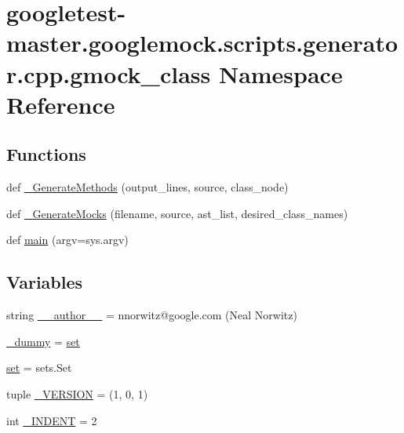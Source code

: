 \hypertarget{namespacegoogletest-master_1_1googlemock_1_1scripts_1_1generator_1_1cpp_1_1gmock__class}{}\section{googletest-\/master.googlemock.\+scripts.\+generator.\+cpp.\+gmock\+\_\+class Namespace Reference}
\label{namespacegoogletest-master_1_1googlemock_1_1scripts_1_1generator_1_1cpp_1_1gmock__class}
\subsection*{Functions}
\begin{DoxyCompactItemize}
\item 
def \mbox{\hyperlink{namespacegoogletest-master_1_1googlemock_1_1scripts_1_1generator_1_1cpp_1_1gmock__class_ab82be69c6bd483ffdd04d11f6bb66256}{\+\_\+\+Generate\+Methods}} (output\+\_\+lines, source, class\+\_\+node)
\item 
def \mbox{\hyperlink{namespacegoogletest-master_1_1googlemock_1_1scripts_1_1generator_1_1cpp_1_1gmock__class_ac9e5319db0f78f43d8dab068e8ac6c42}{\+\_\+\+Generate\+Mocks}} (filename, source, ast\+\_\+list, desired\+\_\+class\+\_\+names)
\item 
def \mbox{\hyperlink{namespacegoogletest-master_1_1googlemock_1_1scripts_1_1generator_1_1cpp_1_1gmock__class_acf709d6f879e39af13ddebafc93b36e2}{main}} (argv=sys.\+argv)
\end{DoxyCompactItemize}
\subsection*{Variables}
\begin{DoxyCompactItemize}
\item 
string \mbox{\hyperlink{namespacegoogletest-master_1_1googlemock_1_1scripts_1_1generator_1_1cpp_1_1gmock__class_a89504a9d8e95b38524b6ee79e7807f83}{\+\_\+\+\_\+author\+\_\+\+\_\+}} = \textquotesingle{}nnorwitz@google.\+com (Neal Norwitz)\textquotesingle{}
\item 
\mbox{\hyperlink{namespacegoogletest-master_1_1googlemock_1_1scripts_1_1generator_1_1cpp_1_1gmock__class_aab1d0a0fe12fff6417f5430ee7cfb927}{\+\_\+dummy}} = \mbox{\hyperlink{namespacegoogletest-master_1_1googlemock_1_1scripts_1_1generator_1_1cpp_1_1gmock__class_ab0cc39d9ef09874228a767d5d835d56a}{set}}
\item 
\mbox{\hyperlink{namespacegoogletest-master_1_1googlemock_1_1scripts_1_1generator_1_1cpp_1_1gmock__class_ab0cc39d9ef09874228a767d5d835d56a}{set}} = sets.\+Set
\item 
tuple \mbox{\hyperlink{namespacegoogletest-master_1_1googlemock_1_1scripts_1_1generator_1_1cpp_1_1gmock__class_abf7a71bde27bae67d68746e33dcadd79}{\+\_\+\+V\+E\+R\+S\+I\+ON}} = (1, 0, 1)
\item 
int \mbox{\hyperlink{namespacegoogletest-master_1_1googlemock_1_1scripts_1_1generator_1_1cpp_1_1gmock__class_a467d2f1d7df04768ccec7d5f3c295200}{\+\_\+\+I\+N\+D\+E\+NT}} = 2
\end{DoxyCompactItemize}


